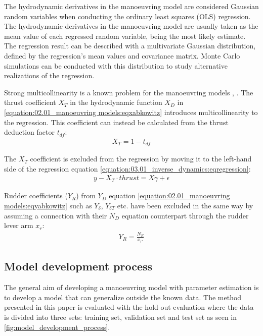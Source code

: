 \noindent The hydrodynamic derivatives in the manoeuvring model are considered Gaussian random variables when conducting the ordinary least squares (OLS) regression. The hydrodynamic derivatives in the manoeuvring model are usually taken as the mean value of each regressed random variable, being the most likely estimate. The regression result can be described with a multivariate Gaussian distribution, defined by the regression’s mean values and covariance matrix. Monte Carlo simulations can be conducted with this distribution to study alternative realizations of the regression.


Strong multicollinearity is a known problem for the manoeuvring models \cite{luo_parameter_2016}, \cite{wang_quantifying_2018}.
The thrust coefficient \(X_T\) in the hydrodynamic function \(X_D\) in \autoref{equation:02.01_manoeuvring models:eqxabkowitz} introduces multicollinearity to the regression. This coefficient can instead be calculated from the thrust deduction factor \(t_{df}\):
\begin{equation}\label{equation:03.01_inverse_dynamics:eqXthrust}
\begin{split}\displaystyle X_{T} = 1 - t_{df}\end{split}
\end{equation}

\noindent The \(X_T\) coefficient is excluded from the regression by moving it to the left-hand side of the regression equation \autoref{equation:03.01_inverse_dynamics:eqregression}:
\begin{equation}\label{equation:03.01_inverse_dynamics:eqexclude}
\begin{split}y-X_T \cdot thrust = X \gamma + \epsilon\end{split}
\end{equation}

\noindent Rudder coefficients (\(Y_R\)) from \(Y_D\) equation \autoref{equation:02.01_manoeuvring models:eqyabkowitz} such as \(Y_{\delta}\), \(Y_{\delta T}\) etc. have been excluded in the same way by assuming a connection with their \(N_D\) equation counterpart through the rudder lever arm \(x_r\):
\begin{equation}\label{equation:03.01_inverse_dynamics:eqyr}
\begin{split}\displaystyle Y_{R} = \frac{N_{R}}{x_{r'}}\end{split}
\end{equation}

\subsection{Model development process}
\label{sec:model_development_process}
The general aim of developing a manoeuvring model with parameter estimation is to develop a model that can generalize outside the known data. The method presented in this paper is evaluated with the hold-out evaluation \cite{sammut_holdout_2017} where the data is divided into three sets: training set, validation set and test set as seen in \autoref{fig:model_development_process}.

